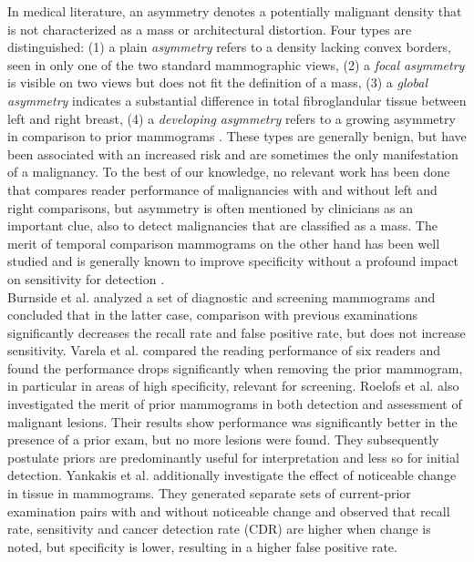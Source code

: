 \documentclass[12pt]{spieman}  %
\begin{document}
In medical literature, an asymmetry denotes a potentially malignant density that is not characterized as a mass or architectural distortion. Four types are distinguished: (1) a plain {\it asymmetry} refers to a density lacking convex borders, seen in only one of the two standard mammographic views, (2) a {\it focal asymmetry} is visible on two views but does not fit the definition of a mass, (3) a {\it global asymmetry} indicates a substantial difference in total fibroglandular tissue between left and right breast, (4) a {\it developing asymmetry} refers to a growing asymmetry in comparison to prior mammograms \cite{Sick07, Youk09}. These types are generally benign, but have been associated with an increased risk \cite{Scut06} and are sometimes the only manifestation of a malignancy. To the best of our knowledge, no relevant work has been done that compares reader performance of malignancies with and without left and right comparisons, but asymmetry is often mentioned by clinicians as an important clue, also to detect malignancies that are classified as a mass. The merit of temporal comparison mammograms on the other hand has been well studied and is generally known to improve specificity without a profound impact on sensitivity for detection \cite{Thur00, Burn02, Vare05, Roel07, Yank11}. \\

Burnside et al. \cite{Burn02} analyzed a set of diagnostic and screening mammograms and concluded that in the latter case, comparison with previous examinations significantly decreases the recall rate and false positive rate, but does not increase sensitivity. Varela et al. \cite{Vare05} compared the reading performance of six readers and found the performance drops significantly when removing the prior mammogram, in particular in areas of high specificity, relevant for screening. Roelofs et al. \cite{Roel07} also investigated the merit of prior mammograms in both detection and assessment of malignant lesions. Their results show performance was significantly better in the presence of a prior exam, but no more lesions were found. They subsequently postulate priors are predominantly useful for interpretation and less so for initial detection. Yankakis et al. \cite{Yank11} additionally investigate the effect of noticeable change in tissue in mammograms. They generated separate sets of current-prior examination pairs with and without noticeable change and observed that recall rate, sensitivity and cancer detection rate (CDR) are higher when change is noted, but specificity is lower, resulting in a higher false positive rate. \\
\end{document}
